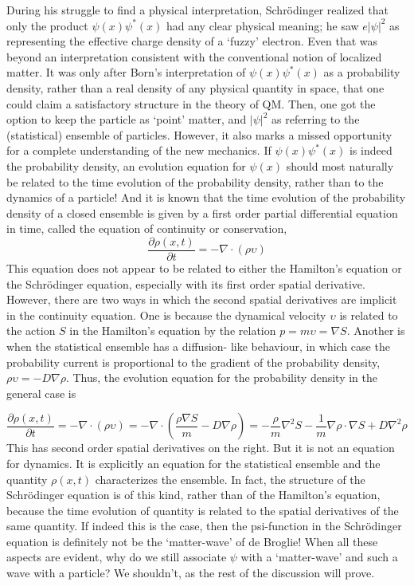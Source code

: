 During his struggle to find a physical interpretation, Schr\"{o}dinger realized that only the
product $\psi(x) \psi^{\ast}(x)$ had any clear physical meaning; he saw $e|\psi|^2$ as representing the effective
charge density of a `fuzzy' electron. Even that was beyond an interpretation consistent
with the conventional notion of localized matter. It was only after Born's interpretation of
$\psi(x)\psi^{\ast} (x)$ as a probability density, rather than a real density of any physical quantity in
space, that one could claim a satisfactory structure in the theory of QM. Then, one got the
option to keep the particle as `point' matter, and $|\psi|^2$ as referring to the (statistical) ensemble
of particles. However, it also marks a missed opportunity for a complete understanding of
the new mechanics. If $\psi(x) \psi^{\ast} (x)$ is indeed the probability density, an evolution equation
for $\psi(x)$ should most naturally be related to the time evolution of the probability density,
rather than to the dynamics of a particle! And it is known that the time evolution of the
probability density of a closed ensemble is given by a first order partial differential equation
in time, called the equation of continuity or conservation,
\begin{equation*}
\frac{\partial \rho (x,t)}{\partial t} = - \nabla \cdot (\rho \upsilon) \tag{8}\label{c14-eq8}
\end{equation*}
This equation does not appear to be related to either the Hamilton's equation or the
Schr\"{o}dinger equation, especially with its first order spatial derivative. However, there are
two ways in which the second spatial derivatives are implicit in the continuity equation. One
is because the dynamical velocity $\upsilon$ is related to the action $S$ in the Hamilton's equation
by the relation $p = m \upsilon =\nabla S$. Another is when the statistical ensemble has a diffusion-
like behaviour, in which case the probability current is proportional to the gradient of the
probability density, $\rho \upsilon = - D \nabla \rho$.
Thus, the evolution equation for the probability density in the general case is

{\fontsize{9}{9}\selectfont\begin{equation*}
\frac{\partial \rho (x,t)}{\partial t} = - \nabla \cdot (\rho \upsilon) = - \nabla \cdot \left(\frac{\rho \nabla S}{m} - D \nabla \rho \right) = - \frac{\rho}{m} \nabla^2 S - \frac{1}{m} \nabla \rho \cdot \nabla S + D \nabla^2 \rho \tag{9}\label{c14-eq9} 
\end{equation*}}
This has second order spatial derivatives on the right. But it is not an equation for dynamics. It
is explicitly an equation for the statistical ensemble and the quantity $\rho (x, t)$ characterizes
the ensemble. In fact, the structure of the Schr\"{o}dinger equation is of this kind, rather than
of the Hamilton's equation, because the time evolution of quantity is related to the spatial
derivatives of the same quantity. If indeed this is the case, then the psi-function in the
Schr\"{o}dinger equation is definitely not be the `matter-wave' of de Broglie! When all these
aspects are evident, why do we still associate $\psi$ with a `matter-wave' and such a wave with a
particle? We shouldn't, as the rest of the discussion will prove.


